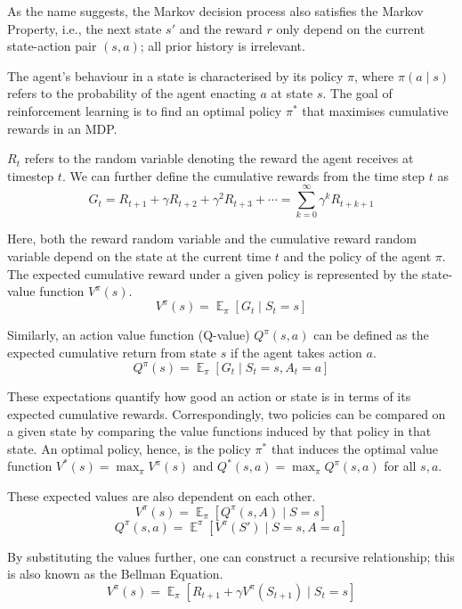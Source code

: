 \documentclass[12pt,a4paper]{report}
\DeclareMathOperator{\EX}{\mathbb{E}}
\begin{document}
As the name suggests, the Markov decision process also satisfies the Markov Property, i.e., the next state $s'$ and the reward $r$ only depend on the current state-action pair $(s, a)$; all prior history is irrelevant. \par

The agent's behaviour in a state is characterised by its policy $\pi$, where $\pi(a \mid s)$ refers to the probability of the agent enacting $a$ at state $s$. The goal of reinforcement learning is to find an optimal policy $\pi^*$ that maximises cumulative rewards in an MDP. \par

$R_{t}$ refers to the random variable denoting the reward the agent receives at timestep $t$. We can further define the cumulative rewards from the time step $t$ as 
\[G_t = R_{t+1} + \gamma R_{t+2} + \gamma^2 R_{t+3} + \cdots = \sum_{k=0}^{\infty} \gamma^k R_{t+k+1}\] \par

Here, both the reward random variable and the cumulative reward random variable depend on the state at the current time $t$ and the policy of the agent $\pi$. The expected cumulative reward under a given policy is represented by the state-value function $V^{\pi}(s)$.
\[
  V^{\pi}(s) = \EX_{\pi}[G_t \mid S_t = s]
\] \par

Similarly, an action value function (Q-value) $Q^\pi (s, a)$ can be defined as the expected cumulative return from state $s$ if the agent takes action $a$. 
\[
  Q^{\pi}(s) = \EX_{\pi}[G_t \mid S_t = s, A_t = a]
\] \par

These expectations quantify how good an action or state is in terms of its expected cumulative rewards. Correspondingly, two policies can be compared on a given state by comparing the value functions induced by that policy in that state. An optimal policy, hence, is the policy $\pi^*$ that induces the optimal value function $V^*(s) = \max_\pi V^\pi(s)$ and $Q^*(s, a) = \max_\pi Q^\pi(s, a)$ for all $s, a$. \par

These expected values are also dependent on each other.
\[
  V^\pi(s) = \EX_{\pi}[Q^\pi(s, A) \mid S = s]
\]
\[
  Q^\pi(s, a) = \EX^\pi[V^\pi(S') \mid S = s, A = a ]
\] \par

By substituting the values further, one can construct a recursive relationship; this is also known as the Bellman Equation.  
\[
  V^\pi(s) = \EX_{\pi}[ R_{t+1} + \gamma V^\pi(S_{t+1}) \mid S_{t}= s]
\] \par
\end{document}
